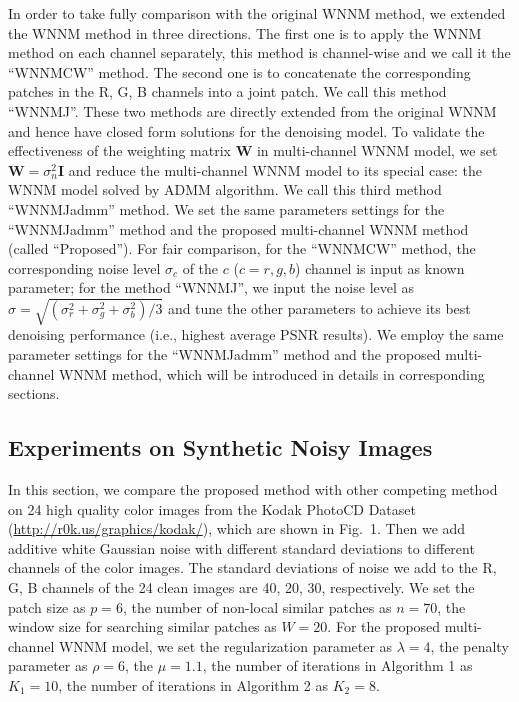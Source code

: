 \documentclass[10pt,twocolumn,letterpaper]{article}
\begin{document}
In order to take fully comparison with the original WNNM method, we extended the WNNM method \cite{wnnmijcv} in three directions. The first one is to apply the WNNM method on each channel separately, this method is channel-wise and we call it the ``WNNMCW'' method. The second one is to concatenate the corresponding patches in the R, G, B channels into a joint patch. We call this method ``WNNMJ''. These two methods are directly extended from the original WNNM and hence have closed form solutions for the denoising model. To validate the effectiveness of the weighting matrix $\mathbf{W}$ in multi-channel WNNM model, we set $\mathbf{W}=\sigma_{n}^{2}\mathbf{I}$ and reduce the multi-channel WNNM model to its special case: the WNNM model solved by ADMM algorithm. We call this third method ``WNNMJadmm'' method. We set the same parameters settings for the ``WNNMJadmm'' method and the proposed multi-channel WNNM method (called ``Proposed''). For fair comparison, for the ``WNNMCW'' method, the corresponding noise level $\sigma_{c}$ of the $c$ ($c=r, g, b$) channel is input as known parameter;  for the method ``WNNMJ'', we input the noise level as $\sigma = \sqrt{(\sigma_{r}^{2}+\sigma_{g}^{2}+\sigma_{b}^{2})/3}$ and tune the other parameters to achieve its best denoising performance (i.e., highest average PSNR results). We employ the same parameter settings for the ``WNNMJadmm'' method and the proposed multi-channel WNNM method, which will be introduced in details in corresponding sections.

\subsection{Experiments on Synthetic Noisy Images}
In this section, we compare the proposed method with other competing method \cite{cbm3d,mlp,wnnm,csf,chen2015learning,noiseclinic,neatimage}
on 24 high quality color images from the Kodak PhotoCD Dataset (\url{http://r0k.us/graphics/kodak/}), which are shown in Fig.\ 1. Then we add additive white Gaussian noise with different standard deviations to different channels of the color images. The standard deviations of noise we add to the R, G, B channels of the 24 clean images are 40, 20, 30, respectively.  We set the patch size as $p = 6$, the number of non-local similar patches as $n = 70$, the window size for searching similar patches as $W = 20$. For the proposed multi-channel WNNM model, we set the regularization parameter as $\lambda=4$, the penalty parameter as $\rho=6$, the $\mu=1.1$, the number of iterations in Algorithm 1 as $K_{1} = 10$, the number of iterations in Algorithm 2 as $K_{2}=8$. 
\end{document}
